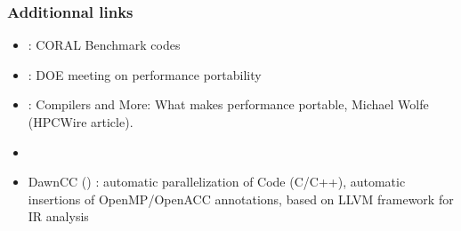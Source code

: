\begin{frame}
  \frametitle{Additionnal links}

  \begin{itemize}
  \item {} : CORAL Benchmark codes
  \item {} : DOE meeting on performance portability
  \item {} : Compilers and More: What makes performance portable, Michael Wolfe (HPCWire article).
  \item {}
  \item DawnCC () : automatic parallelization of Code (C/C++), automatic insertions of OpenMP/OpenACC annotations, based on LLVM framework for IR analysis
  \end{itemize}

\end{frame}

